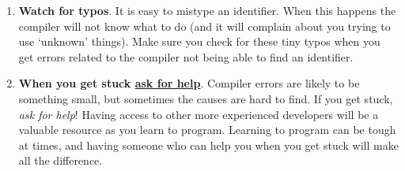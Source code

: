 \begin{enumerate}
  \item \textbf{Watch for typos}. It is easy to mistype an identifier. When this happens the compiler will not know what to do (and it will complain about you trying to use `unknown' things). Make sure you check for these tiny typos when you get errors related to the compiler not being able to find an identifier.
  \item \textbf{When you get stuck \underline{ask for help}}. Compiler errors are likely to be something small, but sometimes the causes are hard to find. If you get stuck, \emph{ask for help}! Having access to other more experienced developers will be a valuable resource as you learn to program. Learning to program can be tough at times, and having someone who can help you when you get stuck will make all the difference.
\end{enumerate}



